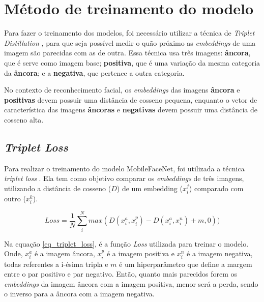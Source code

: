 \section{Método de treinamento do modelo}\label{sec_treinamento_modelo}
Para fazer o treinamento dos modelos, foi necessário utilizar a técnica de \textit{Triplet Distillation}
\cite{triplet_distillation_face_recognition},
para que seja possível medir o quão próximo as \textit{embeddings} de uma imagem são parecidas com as de outra.
Essa técnica usa três imagens: \textbf{âncora}, que é serve como imagem base; \textbf{positiva},
que é uma variação da mesma categoria da \textbf{âncora}; e a \textbf{negativa}, que pertence a outra categoria.

No contexto de reconhecimento facial, os \textit{embeddings} das imagens \textbf{âncora} e \textbf{positivas}
devem possuir uma distância de cosseno pequena, enquanto o vetor de característica das imagens
\textbf{âncoras} e \textbf{negativas} devem possuir uma distância de cosseno alta.

\subsection{\textit{Triplet Loss}}
Para realizar o treinamento do modelo MobileFaceNet, foi utilizada a técnica \textit{triplet loss}
\cite{triplet_distillation_face_recognition}. Ela tem como objetivo comparar os \textit{embeddings} de três imagens,
utilizando a distância de cosseno ($D$) de um embedding ($x_i^j$) comparado com outro ($x_i^k$).

\begin{equation}\label{eq_triplet_loss}
	Loss = \frac 1 N \sum _i ^N max(D(x_i^a, x_i^p) - D(x_i^a, x_i^n) + m, 0))
\end{equation}
%
%

Na equação \ref{eq_triplet_loss}, é a função \textit{Loss} utilizada para treinar o modelo. Onde, $x_i^a$ é
a imagem âncora, $x_i^p$ é a imagem positiva e $x_i^n$ é a imagem negativa, todas referentes a i-ésima
tripla e $m$ é um hiperparâmetro que define a margem entre o par positivo e par negativo.
Então, quanto mais parecidos forem os \textit{embeddings} da imagem âncora com a imagem positiva,
menor será a perda, sendo o inverso para a âncora com a imagem negativa.

